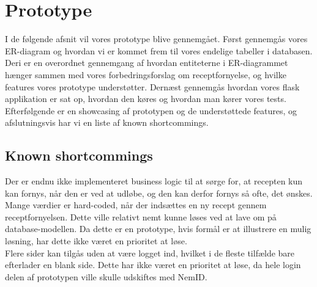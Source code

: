 \section{Prototype}
I de følgende afsnit vil vores prototype blive gennemgået. Først gennemgås vores ER-diagram og hvordan vi er kommet frem til vores endelige tabeller i databasen. Deri er en overordnet gennemgang af hvordan entiteterne i ER-diagrammet hænger sammen med vores forbedringsforslag om receptfornyelse, og hvilke features vores prototype understøtter. Dernæst gennemgås hvordan vores flask applikation er sat op, hvordan den køres og hvordan man kører vores tests. Efterfølgende er en showcasing af prototypen og de understøttede features, og afslutningsvis har vi en liste af known shortcommings.\\







\subsection{Known shortcommings}
Der er endnu ikke implementeret business logic til at sørge for, at recepten kun kan fornys, når den er ved at udløbe, og den kan derfor fornys så ofte, det ønskes.\\
Mange værdier er hard-coded, når der indsættes en ny recept gennem receptfornyelsen. Dette ville relativt nemt kunne løses ved at lave om på database-modellen. Da dette er en prototype, hvis formål er at illustrere en mulig løsning, har dette ikke været en prioritet at løse.\\
Flere sider kan tilgås uden at være logget ind, hvilket i de fleste tilfælde bare efterlader en blank side. Dette har ikke været en prioritet at løse, da hele login delen af prototypen ville skulle udskiftes med NemID.\\

